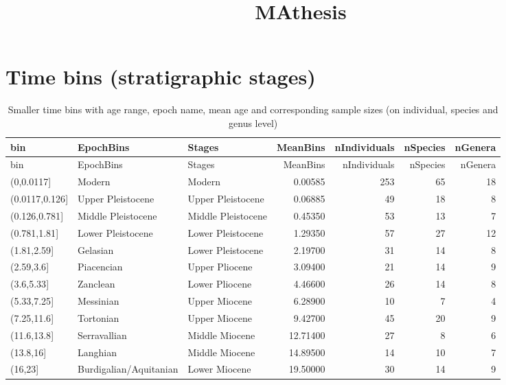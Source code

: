\documentclass[]{article}
\title{MAthesis}
\author{}
\date{}
\begin{document}
\maketitle

{
\setcounter{tocdepth}{2}
\tableofcontents
}
\section{Time bins (stratigraphic
stages)}\label{time-bins-stratigraphic-stages}

\begin{longtable}[]{@{}lllrrrr@{}}
\caption{Smaller time bins with age range, epoch name, mean age and
corresponding sample sizes (on individual, species and genus
level)}\tabularnewline
\toprule
bin & EpochBins & Stages & MeanBins & nIndividuals & nSpecies &
nGenera\tabularnewline
\midrule
\endfirsthead
\toprule
bin & EpochBins & Stages & MeanBins & nIndividuals & nSpecies &
nGenera\tabularnewline
\midrule
\endhead
(0,0.0117{]} & Modern & Modern & 0.00585 & 253 & 65 & 18\tabularnewline
(0.0117,0.126{]} & Upper Pleistocene & Upper Pleistocene & 0.06885 & 49
& 18 & 8\tabularnewline
(0.126,0.781{]} & Middle Pleistocene & Middle Pleistocene & 0.45350 & 53
& 13 & 7\tabularnewline
(0.781,1.81{]} & Lower Pleistocene & Lower Pleistocene & 1.29350 & 57 &
27 & 12\tabularnewline
(1.81,2.59{]} & Gelasian & Lower Pleistocene & 2.19700 & 31 & 14 &
8\tabularnewline
(2.59,3.6{]} & Piacencian & Upper Pliocene & 3.09400 & 21 & 14 &
9\tabularnewline
(3.6,5.33{]} & Zanclean & Lower Pliocene & 4.46600 & 26 & 14 &
8\tabularnewline
(5.33,7.25{]} & Messinian & Upper Miocene & 6.28900 & 10 & 7 &
4\tabularnewline
(7.25,11.6{]} & Tortonian & Upper Miocene & 9.42700 & 45 & 20 &
9\tabularnewline
(11.6,13.8{]} & Serravallian & Middle Miocene & 12.71400 & 27 & 8 &
6\tabularnewline
(13.8,16{]} & Langhian & Middle Miocene & 14.89500 & 14 & 10 &
7\tabularnewline
(16,23{]} & Burdigalian/Aquitanian & Lower Miocene & 19.50000 & 30 & 14
& 9\tabularnewline
\bottomrule
\end{longtable}
\end{document}
